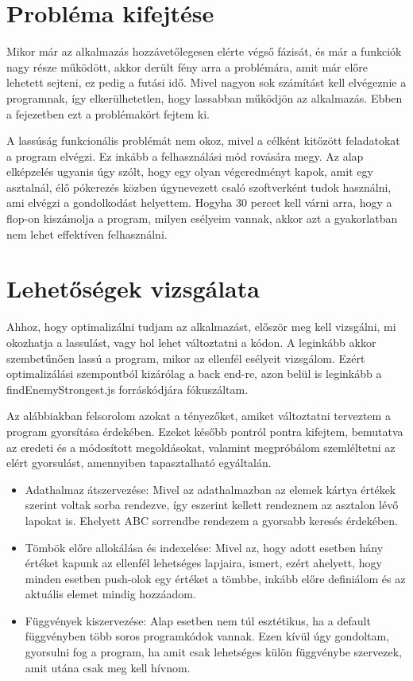 
\section{Probléma kifejtése}
Mikor már az alkalmazás hozzávetőlegesen elérte végső fázisát, és már a funkciók nagy része működött, akkor derült fény arra a problémára, amit már előre lehetett sejteni, ez pedig a futási idő. Mivel nagyon sok számítást kell elvégeznie a programnak, így elkerülhetetlen, hogy lassabban működjön az alkalmazás. Ebben a fejezetben ezt a problémakört fejtem ki.

A lassúság funkcionális problémát nem okoz, mivel a célként kitőzött feladatokat a program elvégzi. Ez inkább a felhasználási mód rovására megy. Az alap elképzelés ugyanis úgy szólt, hogy egy olyan végeredményt kapok, amit egy asztalnál, élő pókerezés közben úgynevezett csaló szoftverként tudok használni, ami elvégzi a gondolkodást helyettem. Hogyha 30 percet kell várni arra, hogy a flop-on kiszámolja a program, milyen esélyeim vannak, akkor azt a gyakorlatban nem lehet effektíven felhasználni.

\section{Lehetőségek vizsgálata}
Ahhoz, hogy optimalizálni tudjam az alkalmazást, először meg kell vizsgálni, mi okozhatja a lassulást, vagy hol lehet változtatni a kódon. A leginkább akkor szembetűnően lassú a program, mikor az ellenfél esélyeit vizsgálom. Ezért optimalizálási szempontból kizárólag a back end-re, azon belül is leginkább a findEnemyStrongest.js forráskódjára fókuszáltam.

Az alábbiakban felsorolom azokat a tényezőket, amiket változtatni terveztem a program gyorsítása érdekében. Ezeket később pontról pontra kifejtem, bemutatva az eredeti és a módosított megoldásokat, valamint megpróbálom szemléltetni az elért gyorsulást, amennyiben tapasztalható egyáltalán.
\begin{itemize}
    \item Adathalmaz átszervezése: Mivel az adathalmazban az elemek kártya értékek szerint voltak sorba rendezve, így eszerint kellett rendeznem az asztalon lévő lapokat is. Ehelyett ABC sorrendbe rendezem a gyorsabb keresés érdekében.
    \item Tömbök előre allokálása és indexelése: Mivel az, hogy adott esetben hány értéket kapunk az ellenfél lehetséges lapjaira, ismert, ezért ahelyett, hogy minden esetben push-olok egy értéket a tömbbe, inkább előre definiálom és az aktuális elemet mindig hozzáadom.
    \item Függvények kiszervezése: Alap esetben nem túl esztétikus, ha a default függvényben több soros programkódok vannak. Ezen kívül úgy gondoltam, gyorsulni fog a program, ha amit csak lehetséges külön függvénybe szervezek, amit utána csak meg kell hívnom.
\end{itemize}

